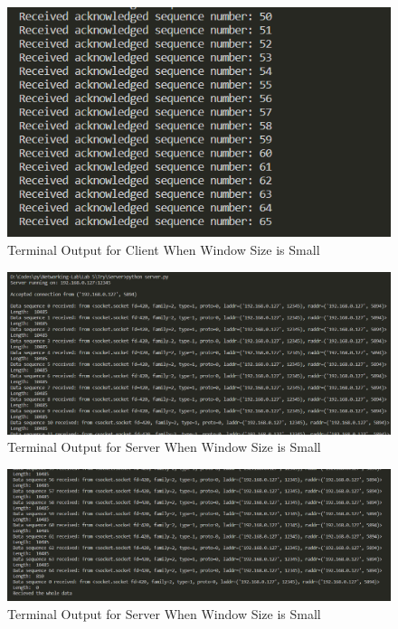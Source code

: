 \documentclass[11pt]{article}
\begin{document}
    \FloatBarrier
    \begin{figure}[h]
        \centering
        \includegraphics[width=1.0\textwidth]{client2.2.png}
        \caption{Terminal Output for Client When Window Size is Small}
    \end{figure}
    \FloatBarrier
    
    \begin{figure}[h]
        \centering
        \includegraphics[width=1.0\textwidth]{server2.png}
        \caption{Terminal Output for Server When Window Size is Small}
        \label{fig:response_message}
    \end{figure}
    \FloatBarrier
    \begin{figure}[h]
        \centering
        \includegraphics[width=1.0\textwidth]{server2.2.png}
        \caption{Terminal Output for Server When Window Size is Small}
        \label{fig:response_message}
    \end{figure}
    \FloatBarrier
\newpage
\end{document}

